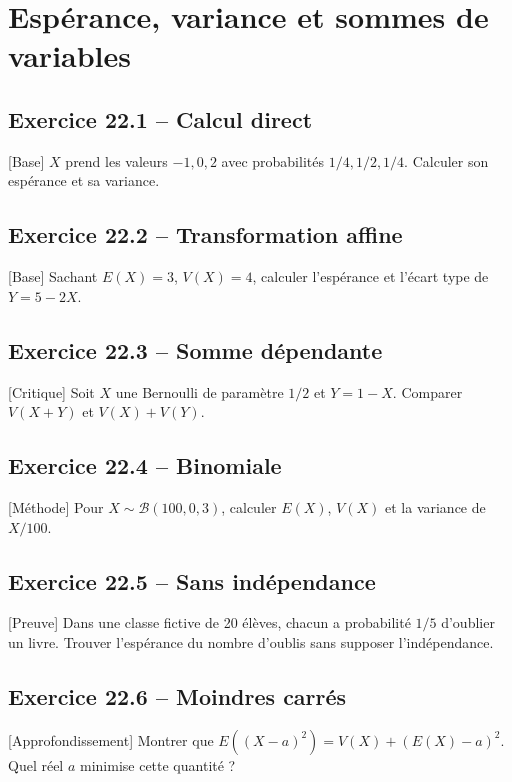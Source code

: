 \chapter{Espérance, variance et sommes de variables}
\section*{Exercice 22.1 -- Calcul direct}
[Base] $X$ prend les valeurs $-1,0,2$ avec probabilités $1/4,1/2,1/4$. Calculer son espérance et sa variance.

\section*{Exercice 22.2 -- Transformation affine}
[Base] Sachant $E(X)=3$, $V(X)=4$, calculer l'espérance et l'écart type de $Y=5-2X$.

\section*{Exercice 22.3 -- Somme dépendante}
[Critique] Soit $X$ une Bernoulli de paramètre $1/2$ et $Y=1-X$. Comparer $V(X+Y)$ et $V(X)+V(Y)$.

\section*{Exercice 22.4 -- Binomiale}
[Méthode] Pour $X\sim\mathcal B(100,0{,}3)$, calculer $E(X)$, $V(X)$ et la variance de $X/100$.

\section*{Exercice 22.5 -- Sans indépendance}
[Preuve] Dans une classe fictive de 20 élèves, chacun a probabilité $1/5$ d'oublier un livre. Trouver l'espérance du nombre d'oublis sans supposer l'indépendance.

\section*{Exercice 22.6 -- Moindres carrés}
[Approfondissement] Montrer que $E((X-a)^2)=V(X)+(E(X)-a)^2$. Quel réel $a$ minimise cette quantité ?
